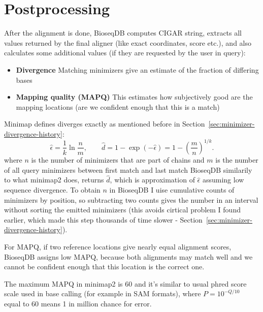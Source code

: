 \section{Postprocessing}
\label{sec:alignment-postprocessing}

After the alignment is done, BioseqDB computes CIGAR string, extracts all values returned by the final aligner (like exact coordinates, score etc.), and also calculates
some additional values (if they are requested by the user in query):
\begin{itemize}
  \item \textbf{Divergence} Matching minimizers give an estimate of the fraction of differing bases
  \item \textbf{Mapping quality (MAPQ)} This estimates how subjectively good are the mapping locations (are we confident enough that this is a match)
\end{itemize}

Minimap defines diverges exactly as mentioned before in Section~\ref{sec:minimizer-divergence-history}:
\begin{equation}
  \widehat{\epsilon}=\frac{1}{k}\ln\frac{n}{m},
  \qquad
  \widehat{d}=1-\exp(-\widehat{\epsilon})
            =1-\left(\frac{m}{n}\right)^{1/k}.
  \label{eq:postprocessing-divergence}
\end{equation}
where $n$ is the number of minimizers that are part of chains and $m$ is the number of all query minimizers between first match and last match
BioseqDB similarily to what minimap2 does, returns
\(\widehat{d}\), which is approximation of \(\widehat{\epsilon}\) assuming low sequence divergence.
To obtain \(n\) in BioseqDB I uise cumulative counts of minimizers by position, so subtracting two counts gives the number in an interval without
sorting the emitted minimizers (this avoids cirtical problem I found earlier, which made this step thousands of time slower - Section~\ref{sec:minimizer-divergence-history}).

For MAPQ, if two reference locations give nearly equal alignment scores, BioseqDB assigns
low MAPQ, because both alignments may match well and we cannot be confident enough that this location is the correct one.

The maximum MAPQ in minimap2 is 60 and it's similar to usual phred score scale used in base calling (for example in SAM formats), where $P=10^{-Q/10}$~\autocite{sam_format_specification}
equal to 60 means 1 in million chance for error.


